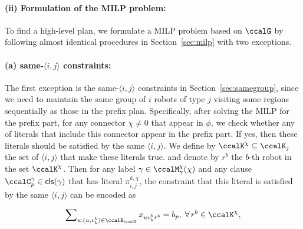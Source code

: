 \documentclass[Afour,sageh,times]{sagej}
\newcommand{\clause}[1]{\mathsf{cls}(#1)}
\newcommand{\ag}[2]{\langle#1,#2\rangle}
\newcommand{\aap}[4]{\mathcal{\pi}_{{#1},{#2}}^{#3,#4}}
\begin{document}
{{ \paragraph{(ii) Formulation of the MILP problem:}  To find a high-level plan, we formulate a MILP problem based on $\ccalG$ by following almost identical procedures in Section~\ref{sec:milp} with two exceptions.

\paragraph{\quad (a) same-$\ag{i}{j}$ constraints:} The first exception is the same-$\ag{i}{j}$ constraints in Section~\ref{sec:samegroup}, since we need to maintain the same group of $i$ robots of type $j$ visiting some regions sequentially as those in the prefix plan. Specifically, after solving the MILP for the prefix part, for any connector $\chi\not=0$ that appear in $\phi$, we check whether any of literals that include this connector appear in the prefix part. If yes, then these literals should be satisfied by the same $\ag{i}{j}$. We define by $\ccalK^\chi \subseteq \ccalK_j$ the set of $\ag{i}{j}$ that make these literals true. and denote by  $r^b$ the $b$-th robot in the set $\ccalK^\chi$. Then for any label $\gamma \in\ccalM_\mathsf{\gamma}^\chi(\chi)$ and any clause $\ccalC_p^\gamma \in \clause{\gamma}$ that has  literal $\aap{i}{j}{k}{\chi}$, the constraint that this literal is satisfied by the same $\ag{i}{j}$  can be encoded as}
\begingroup\makeatletter{}\check@mathfonts
\def\maketag@@@#1{\hbox{\m@th\normalsize\normalfont#1}}%
\begin{align}\label{eq:same_suffix}
    \sum\nolimits_{u:(u, v_k^b) \in \ccalE_\ccalG} x_{u v_k^b r^b} =  b_p, \;\forall\, r^b \in \ccalK^\chi,
  \end{align}
\endgroup
}
\end{document}
